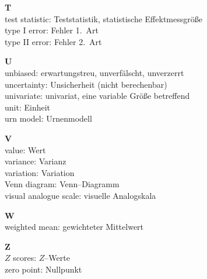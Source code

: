\medskip
\noindent
{\bf T}\\
test statistic: Teststatistik, statistische
Effektmessgr\"{o}\ss e\\
type I error: Fehler 1.~Art\\
type II error: Fehler 2.~Art

\medskip
\noindent
{\bf U}\\
unbiased: erwartungstreu, unverf\"{a}lscht, unverzerrt\\
uncertainty: Unsicherheit (nicht berechenbar)\\
univariate: univariat, eine variable Gr\"{o}\ss e betreffend\\
unit: Einheit\\
urn model: Urnenmodell

\medskip
\noindent
{\bf V}\\
value: Wert\\
variance: Varianz\\
variation: Variation\\
Venn diagram: Venn--Diagramm\\
visual analogue scale: visuelle Analogskala

\medskip
\noindent
{\bf W}\\
weighted mean: gewichteter Mittelwert

\medskip
\noindent
{\bf Z}\\
$Z$ scores: $Z$--Werte\\
zero point: Nullpunkt

